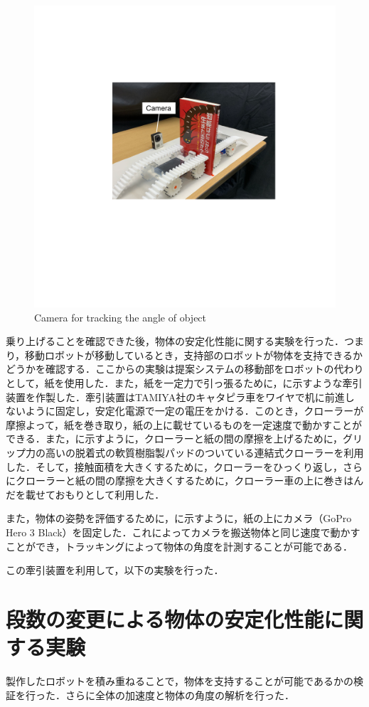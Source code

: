 \begin{figure}[tb]
  \centering
  \includegraphics[width=0.6\columnwidth]{figure/gopro.pdf}
  \caption{Camera for tracking the angle of object}
  \label{fig:gopro}
\end{figure}

乗り上げることを確認できた後，物体の安定化性能に関する実験を行った．つまり，移動ロボットが移動しているとき，支持部のロボットが物体を支持できるかどうかを確認する．ここからの実験は提案システムの移動部をロボットの代わりとして，紙を使用した．また，紙を一定力で引っ張るために，に示すような牽引装置を作製した．牽引装置はTAMIYA社のキャタピラ車をワイヤで机に前進しないように固定し，安定化電源で一定の電圧をかける．このとき，クローラーが摩擦よって，紙を巻き取り，紙の上に載せているものを一定速度で動かすことができる．また，に示すように，クローラーと紙の間の摩擦を上げるために，グリップ力の高いの脱着式の軟質樹脂製パッドのついている連結式クローラーを利用した．そして，接触面積を大きくするために，クローラーをひっくり返し，さらにクローラーと紙の間の摩擦を大きくするために，クローラー車の上に巻きはんだを載せておもりとして利用した．

また，物体の姿勢を評価するために，に示すように，紙の上にカメラ（GoPro Hero 3 Black）を固定した．これによってカメラを搬送物体と同じ速度で動かすことができ，トラッキングによって物体の角度を計測することが可能である．

この牽引装置を利用して，以下の実験を行った．

\section{段数の変更による物体の安定化性能に関する実験}
\label{section:exp2}
製作したロボットを積み重ねることで，物体を支持することが可能であるかの検証を行った．さらに全体の加速度と物体の角度の解析を行った．

